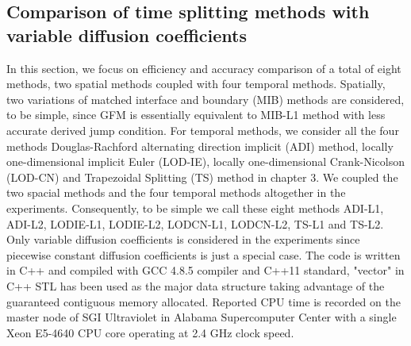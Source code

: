 \documentclass[dissertation]{uathesis}
\begin{document}
\begin{body}
\begin{flushleft}
\section{Comparison of time splitting methods with variable diffusion coefficients}
\hspace{1cm} In this section, we focus on efficiency and accuracy comparison of a total of eight methods, two spatial methods coupled with four temporal methods. Spatially, two variations of matched interface and boundary (MIB) methods are considered, to be simple, since GFM is essentially equivalent to MIB-L1 method with less accurate derived jump condition. For temporal methods, we consider all the four methods Douglas-Rachford alternating direction implicit (ADI) method, locally one-dimensional implicit Euler (LOD-IE), locally one-dimensional Crank-Nicolson (LOD-CN) and Trapezoidal Splitting (TS) method in chapter 3. We coupled the two spacial methods and the four temporal methods altogether in the experiments. Consequently, to be simple we call these eight methods ADI-L1, ADI-L2, LODIE-L1, LODIE-L2, LODCN-L1, LODCN-L2, TS-L1 and TS-L2. Only variable diffusion coefficients is considered in the experiments since piecewise constant diffusion coefficients is just a special case. The code is written in C++ and compiled with GCC 4.8.5 compiler and C++11 standard, "vector" in C++ STL has been used as the major data structure taking advantage of the guaranteed contiguous memory allocated. Reported CPU time is recorded on the master node of SGI Ultraviolet in Alabama Supercomputer Center with a single Xeon E5-4640 CPU core operating at 2.4 GHz clock speed.


\end{flushleft}
\end{body}
\end{document}
